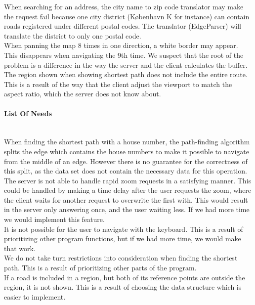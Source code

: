 \documentclass[a4paper,10pt,titlepage]{article}
\begin{document}
When searching for an address, the city name to zip code translator may make the request fail because one city district (K\o benhavn K for instance) can contain roads registered under different postal codes. The translator (EdgeParser) will translate the district to only one postal code.\\

When panning the map 8 times in one direction, a white border may appear. This disappears when navigating the 9th time. We suspect that the root of the problem is a difference in the way the server and the client calculates the buffer.\\

The region shown when showing shortest path does not include the entire route. This is a result of the way that the client adjust the viewport to match the aspect ratio, which the server does not know about.

		\paragraph{List Of Needs}\mbox{}\\
		
When finding the shortest path with a house number, the path-finding algorithm splits the edge which contains the house numbers to make it possible to navigate from the middle of an edge. However there is no guarantee for the correctness of this split, as the data set does not contain the necessary data for this operation.\\

The server is not able to handle rapid zoom requests in a satisfying manner. This could be handled by making a time delay after the user requests the zoom, where the client waits for another request to overwrite the first with. This would result in the server only answering once, and the user waiting less. If we had more time we would implement this feature.\\

It is not possible for the user to navigate with the keyboard. This is a result of prioritizing other program functions, but if we had more time, we would make that work.\\

We do not take turn restrictions into consideration when finding the shortest path. This is a result of prioritizing other parts of the program.\\

If a road is included in a region, but both of its reference points are outside the region, it is not shown. This is a result of choosing the data structure which is easier to implement.
			
\end{document}
